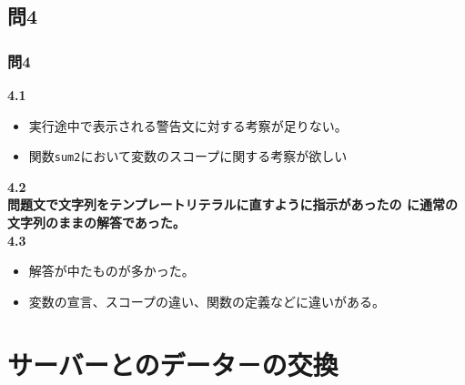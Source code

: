  \subsection{問4}
  \begin{frame}[containsverbatim]
   \frametitle{問4}
   \bfseries{4.1}
   \begin{itemize}
   \item 実行途中で表示される警告文に対する考察が足りない。
   \item 関数\texttt{sum2}において変数のスコープに関する考察が欲しい
   \end{itemize}
   \bfseries{4.2}\\
 問題文で文字列をテンプレートリテラルに直すように指示があったの
         に通常の文字列のままの解答であった。\\
 \bfseries{4.3}\\
   \begin{itemize}
    \item 解答が中たものが多かった。
    \item 変数の宣言、スコープの違い、関数の定義などに違いがある。
   \end{itemize}
  \end{frame}
 \section{サーバーとのデータ－の交換}
